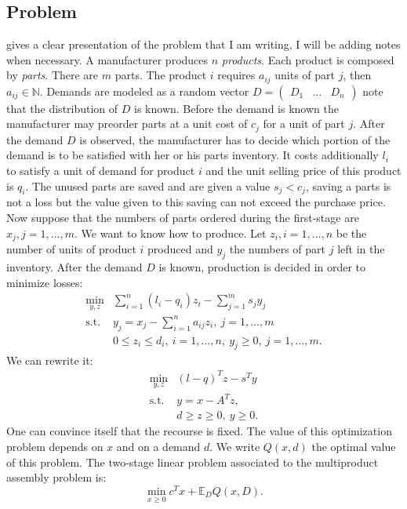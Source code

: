 \documentclass{amsart}
\begin{document}
\subsection{Problem}
\cite[Chapter 1.3]{shapiro_lectures_2009} gives a clear presentation of the problem that I am writing, I will be adding notes when necessary. A manufacturer produces $n$ \emph{products}. Each product is composed by \emph{parts}. There are $m$ parts. The product $i$ requires $a_{ij}$ units of part $j$, then $a_{ij}\in\mathbb{N}$. Demands are modeled as a random vector $D=\begin{pmatrix} D_1 & \hdots & D_n \end{pmatrix}$ note that the distribution of $D$ is known. Before the demand is known the manufacturer may preorder parts at a unit cost of $c_j$ for a unit of part $j$. After the demand $D$ is observed, the manufacturer has to decide which portion of the demand is to be satisfied with her or his parts inventory. It costs additionally $l_i$ to satisfy a unit of demand for product $i$ and the unit selling price of this product is $q_i$. The unused parts are saved and are given a value $s_j < c_j$, saving a parts is not a loss but the value given to this saving can not exceed the purchase price. Now suppose that the numbers of parts ordered during the first-stage are $x_j, j=1,\hdots,m$. We want to know how to produce. Let $z_i,i=1,\hdots,n$ be the number of units of product $i$ produced and $y_j$ the numbers of part $j$ left in the inventory. After the demand $D$ is known, production is decided in order to minimize losses:
\begin{align*}
    \min_{y,z} &\sum_{i=1}^n\left(l_i-q_i\right)z_i-\sum_{j=1}^ms_jy_j \\
     \text{s.t. } &y_j=x_j-\sum_{i=1}^na_{ij}z_i, \: j=1,\hdots,m \\
     & 0 \leq z_i\leq d_i, \: i=1,\hdots,n, \: y_j\geq0, \: j=1,\hdots,m.
\end{align*}
We can rewrite it:
\begin{align*}
    \min_{y,z} & \left(l-q\right)^Tz-s^Ty \\
     \text{s.t. } &y=x-A^Tz, \\
     & d \geq z\geq 0, \:y\geq0.
\end{align*}
One can convince itself that the recourse is fixed. The value of this optimization problem depends on $x$ and on a demand $d$. We write $Q\left(x,d\right)$ the optimal value of this problem. The two-stage linear problem associated to the multiproduct assembly problem is:
$$\min_{x\geq0}c^Tx+\mathbb{E}_DQ\left(x,D\right).$$
\end{document}
